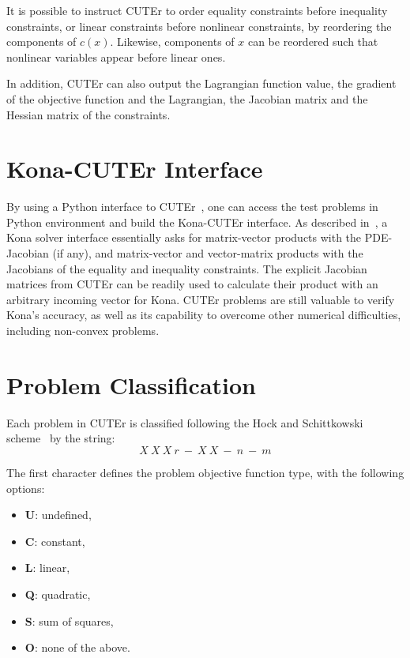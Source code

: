 It is possible to instruct CUTEr to order equality constraints before inequality constraints, or linear constraints before nonlinear constraints, by reordering the components of $c(x)$. Likewise, components of $x$ can be reordered such that nonlinear variables appear before linear ones. 

In addition, CUTEr can also output 
the Lagrangian function value, the gradient of the objective function and the Lagrangian, the Jacobian matrix and the Hessian matrix of the constraints. 

\section{Kona-CUTEr Interface}\label{sec:konacut}
By using a Python interface to CUTEr~\cite{cuter_python}, one can access the test problems in Python environment and build the Kona-CUTEr interface. As described in~\cite{dener:scitech2016}, a Kona solver interface essentially asks for matrix-vector products with the PDE-Jacobian (if any),  
 and matrix-vector and vector-matrix products with the Jacobians of the equality and inequality constraints. 
The explicit Jacobian matrices from CUTEr can be readily used to calculate their product with an arbitrary incoming vector for Kona.  CUTEr problems are still valuable to verify Kona's accuracy, as well as its capability to overcome other numerical difficulties, including non-convex problems. 



\section{Problem Classification}\label{sec:cuter_clas}
Each problem in CUTEr is classified following the Hock and Schittkowski scheme~\cite{cuterScheme} by the string: 
\begin{equation*}
X \ X \ X \ r \ - \ X \ X \ - \ n \ - \ m
\end{equation*}

The first character defines the problem objective function type, with the following options: 
\begin{itemize}  \itemsep -8pt 
\item \textbf{U}: undefined,
\item  \textbf{C}: constant, 
\item \textbf{L}: linear, 
\item \textbf{Q}: quadratic, 
\item  \textbf{S}: sum of squares, 
\item  \textbf{O}: none of the above. 
\end{itemize}

